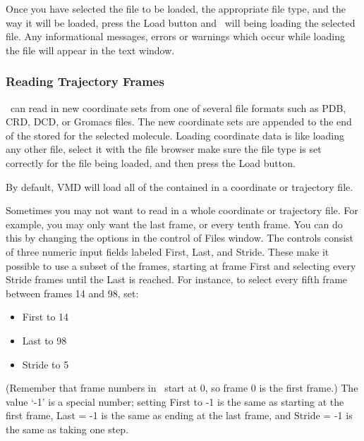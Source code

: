 Once you have selected the file to be loaded, the appropriate file type,
and the way it will be loaded, press the {\sf Load} button and \VMD\ will
being loading the selected file.  Any informational messages, 
errors or warnings which occur while loading the file will appear 
in the text window.


\subsubsection{Reading Trajectory Frames}
\label{ug:ui:window:edit:read}
\VMD\ can read in new coordinate sets from one of several file
formats such as PDB, CRD, DCD, or Gromacs files.
The new coordinate sets are appended to the end of the
stored \timesteps for the selected molecule.  
Loading coordinate data is like loading any other file, select it
with the file browser make sure the file type is set correctly for
the file being loaded, and then press the {\sf Load} button.

By default, VMD will load all of the \timesteps contained in a 
coordinate or trajectory file. 

Sometimes you may not want to read in a whole coordinate or
trajectory file.  For example, you may only want the last frame, 
or every tenth frame.  You can do this by changing the options in the 
{\sf \Timesteps} control of Files window.
\label{ug:ui:window:edit:amount}
The {\sf \Timesteps} controls consist of three numeric input fields 
labeled {\sf First}, {\sf Last}, and {\sf Stride}.  These make it
possible to use a subset of the frames, starting at frame {\sf First}
and selecting every {\sf Stride} frames until the {\sf Last} is reached.
For instance, to select every fifth frame between frames 14 and 98,
set:

\begin{itemize}
  \item{{\sf First} to 14}
  \item{{\sf Last} to 98}
  \item{{\sf Stride} to 5}
\end{itemize}

(Remember that frame numbers in \VMD\ start at 0, so frame 0 is the
first frame.)  The value `-1' is a special number; setting {\sf First}
to -1 is the same as starting at the first frame, {\sf Last} = -1 is
the same as ending at the last frame, and {\sf Stride} = -1 is the same
as taking one step.

